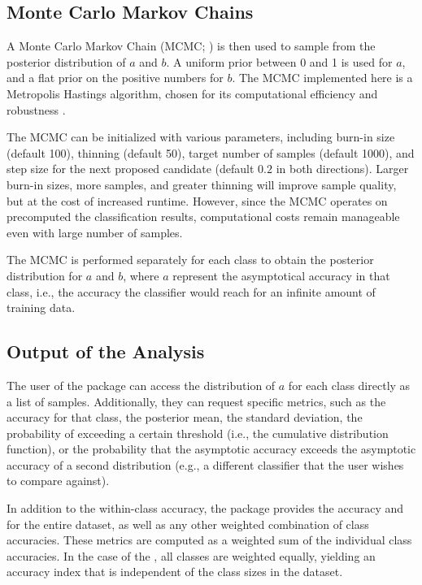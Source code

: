 \documentclass[man]{apa7}
\begin{document}
\subsection{Monte Carlo Markov Chains} \label{sec:mcmc}
A Monte Carlo Markov Chain (MCMC; \citep{metropolis1953equation}) is then used to sample from the posterior distribution of $a$ and $b$. A uniform prior between 0 and 1 is used for $a$, and a flat prior on the positive numbers for $b$. The MCMC implemented here is a Metropolis Hastings algorithm, chosen for its computational efficiency and robustness \citep{hastings1970monte}.

The MCMC can be initialized with various parameters, including burn-in size (default 100), thinning (default 50), target number of samples (default 1000), and step size for the next proposed candidate (default $0.2$ in both directions). Larger burn-in sizes, more samples, and greater thinning will improve sample quality, but at the cost of increased runtime. However, since the MCMC operates on precomputed the classification results, computational costs remain manageable even with large number of samples.

The MCMC is performed separately for each class to obtain the posterior distribution for $a$ and $b$, where $a$ represent the asymptotical accuracy in that class, i.e., the accuracy the classifier would reach for an infinite amount of training data.

\subsection{Output of the Analysis} \label{sec:output_analysis}
The user of the package can access the distribution of $a$ for each class directly as a list of samples. Additionally, they can request specific metrics, such as the  accuracy for that class, the posterior mean, the standard deviation, the probability of exceeding a certain threshold (i.e., the cumulative distribution function), or the probability that the asymptotic accuracy exceeds the asymptotic accuracy of a second distribution (e.g., a different classifier that the user wishes to compare against).

In addition to the within-class accuracy, the package provides the accuracy and  for the entire dataset, as well as any other weighted combination of class accuracies. These metrics are computed as a weighted sum of the individual class accuracies. In the case of the , all classes are weighted equally, yielding an accuracy index that is independent of the class sizes in the dataset.
\end{document}
